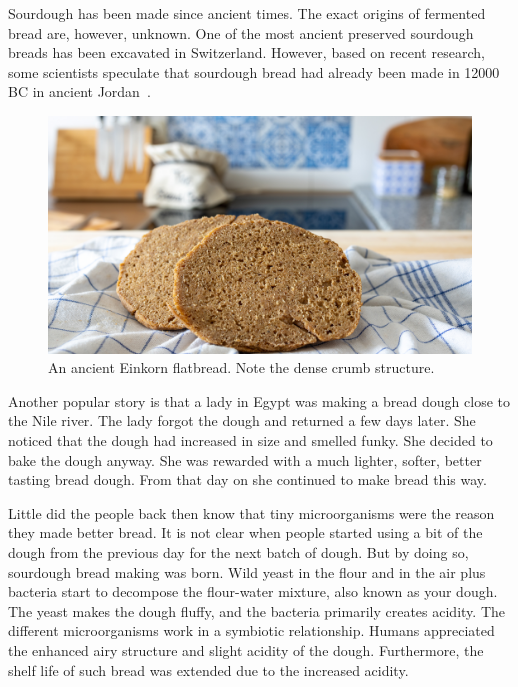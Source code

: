 Sourdough has been made since ancient times. The exact origins of fermented
bread are, however, unknown. One of the most ancient preserved
sourdough breads has been excavated in Switzerland.
However, based on recent research, some scientists speculate that sourdough
bread had already been made in 12000 BC in ancient Jordan~\cite{jordan+bread}.

\begin{figure}[h]
  \includegraphics[width=\textwidth]{einkorn-crumb}
  \caption{An ancient Einkorn flatbread. Note the dense crumb structure.}
  \label{einkorn-crumb}
\end{figure}

Another popular story is that a lady in Egypt was making
a bread dough close to the Nile river. The lady forgot the
dough and returned a few days later. She noticed that the dough had
increased in size and smelled funky. She decided to bake
the dough anyway. She was rewarded with a much
lighter, softer, better tasting bread dough. From that day
on she continued to make bread this way.

Little did the people back then know that tiny microorganisms
were the reason they made better bread. It is not clear when
people started using a bit of the dough from the previous
day for the next batch of dough. But by doing so, sourdough
bread making was born. Wild yeast in the flour and in the air
plus bacteria start to decompose the flour-water mixture, also
known as your dough. The yeast makes the dough fluffy, and
the bacteria primarily creates acidity. The different
microorganisms work in a symbiotic relationship. Humans
appreciated the enhanced airy structure and slight acidity
of the dough. Furthermore, the shelf life of such bread
was extended due to the increased acidity. 

